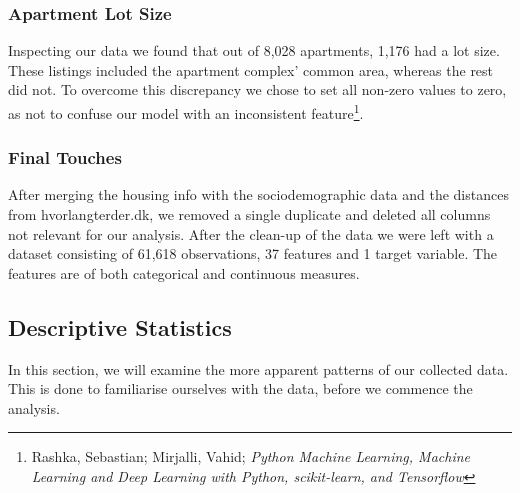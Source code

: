 \documentclass[12pt,a4paper]{article}
\begin{document}
\subsubsection{Apartment Lot Size}
Inspecting our data we found that out of 8,028 apartments, 1,176 had a lot size. These listings included the apartment complex' common area, whereas the rest did not. To overcome this discrepancy we chose to set all non-zero values to zero, as not to confuse our model with an inconsistent feature\footnote{Rashka, Sebastian; Mirjalli, Vahid; \textit{Python Machine Learning, Machine Learning and Deep Learning with Python, scikit-learn, and Tensorflow}}.

\subsubsection{Final Touches}
After merging the housing info with the sociodemographic data and the distances from hvorlangterder.dk, we removed a single duplicate and deleted all columns not relevant for our analysis. After the clean-up of the data we were left with a dataset consisting of 61,618  observations, 37 features and 1 target variable. The features are of both categorical and continuous measures.

\subsection{Descriptive Statistics}
In this section, we will examine the more apparent patterns of our collected data. This is done to familiarise ourselves with the data, before we commence the analysis.
\end{document}
